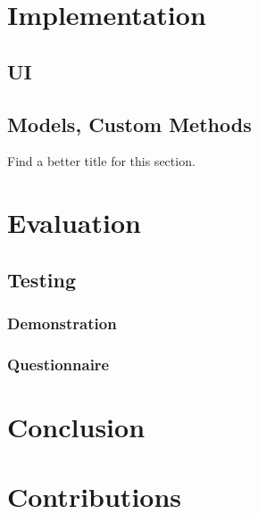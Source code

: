 \documentclass{l3proj}
\begin{document}
\chapter{Implementation}
\label{impl}

\section{UI}
\label{impl:ui}



\section{Models, Custom Methods}
\label{impl:models}
Find a better title for this section.

\chapter{Evaluation}
\label{eval}

\section{Testing}
\label{eval:testing}

\subsection{Demonstration}
\label{eval:demo}

\subsection{Questionnaire}
\label{eval:question}

\chapter{Conclusion}
\label{conc}

\chapter{Contributions}
\label{contribs}


\clearpage


\end{document}
